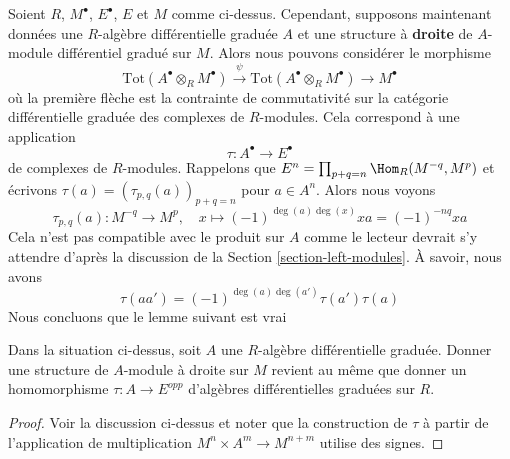 \noindent
Soient $R$, $M^\bullet$, $E^\bullet$, $E$ et $M$ comme ci-dessus. Cependant,
supposons maintenant données une $R$-algèbre différentielle graduée $A$ et une
structure à {\bf droite} de $A$-module différentiel gradué sur $M$. Alors nous
pouvons considérer le morphisme
$$
\text{Tot}(A^\bullet \otimes_R M^\bullet)
\xrightarrow{\psi}
\text{Tot}(A^\bullet \otimes_R M^\bullet)
\to
M^\bullet
$$
où la première flèche est la contrainte de commutativité sur la catégorie
différentielle graduée des complexes de $R$-modules. Cela correspond à une
application
$$
\tau : A^\bullet \longrightarrow E^\bullet
$$
de complexes de $R$-modules. Rappelons que $E^n = \prod_{p + q = n} \Hom_R(M^{-q},
M^p)$ et écrivons $\tau(a) = (\tau_{p, q}(a))_{p + q = n}$ pour $a \in A^n$. Alors
nous voyons
$$
\tau_{p, q}(a) : M^{-q} \longrightarrow M^p,\quad
x \longmapsto (-1)^{\deg(a)\deg(x)}x a = (-1)^{-nq}xa
$$
Cela n'est pas compatible avec le produit sur $A$ comme le lecteur devrait s'y
attendre d'après la discussion de la Section \ref{section-left-modules}. À savoir,
nous avons
$$
\tau(a a') = (-1)^{\deg(a)\deg(a')}\tau(a') \tau(a)
$$
Nous concluons que le lemme suivant est vrai

\begin{lemma}
\label{lemma-right-module-structure}
Dans la situation ci-dessus, soit $A$ une $R$-algèbre différentielle graduée.
Donner une structure de $A$-module à droite sur $M$ revient au même que donner un
homomorphisme $\tau : A \to E^{opp}$ d'algèbres différentielles graduées sur $R$.
\end{lemma}

\begin{proof}
Voir la discussion ci-dessus et noter que la construction de $\tau$ à partir de
l'application de multiplication $M^n \times A^m \to M^{n + m}$ utilise des signes.
\end{proof}

